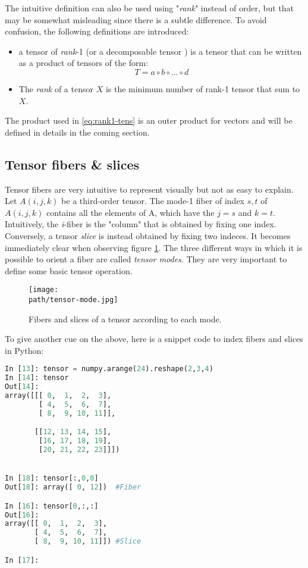 The intuitive definition can also be used using "\emph{rank}" instead of order, but that may be somewhat misleading since there is a subtle difference. To avoid confusion, the following definitions are introduced: 
\begin{itemize}
  \item a tensor of \emph{rank}-1 (or a decomposable tensor \parencite{tensor-hackbusch}) is a tensor that can be written as a product of tensors of the form: 
  \begin{equation}
  \label{eq:rank1-tens}
    T = a \circ b \circ \ldots \circ d  
  \end{equation}   
  
  \item The \emph{rank} of a tensor $X$ is the minimum number of rank-1 tensor that sum to $X$.

\end{itemize}

The product used in \ref{eq:rank1-tens} is an outer product for vectors and will be defined in details in the coming section. 

\subsection{Tensor fibers \& slices}
Tensor fibers are very intuitive to represent visually but not as easy to explain. \\
Let $A(i,j,k)$ be a third-order tensor. The mode-1 fiber of index $s,t$  of $A(i,j,k)$ contains all the elements of A, which have the $j=s$ and $k=t$. 
\\
Intuitively, the \emph{i}-fiber is the "column" that is obtained by fixing one index. Conversely, a tensor \emph{slice} is instead obtained by fixing two indeces. It becomes immediately clear when observing figure \ref{fig:tensor-fibers}. The three different ways in which it is possible to orient a fiber are called \emph{tensor modes}. They are very important to define some basic tensor operation. 

\begin{figure}[h!]
 \centering
 \texttt{[image: \\path/tensor-mode.jpg]} 
 \caption{Fibers and slices of a tensor according to each mode.}
 \label{fig:tensor-fibers}
\end{figure}

\pagebreak
To give another cue on the above, here is a snippet code to index fibers and slices in Python: 
\begin{lstlisting}[language={Python}]
In [13]: tensor = numpy.arange(24).reshape(2,3,4) 
In [14]: tensor
Out[14]: 
array([[[ 0,  1,  2,  3],
        [ 4,  5,  6,  7],
        [ 8,  9, 10, 11]],

       [[12, 13, 14, 15],
        [16, 17, 18, 19],
        [20, 21, 22, 23]]])


In [18]: tensor[:,0,0]
Out[18]: array([ 0, 12])  #Fiber

In [16]: tensor[0,:,:]
Out[16]: 
array([[ 0,  1,  2,  3],
       [ 4,  5,  6,  7],
       [ 8,  9, 10, 11]]) #Slice 

In [17]: 

\end{lstlisting}


